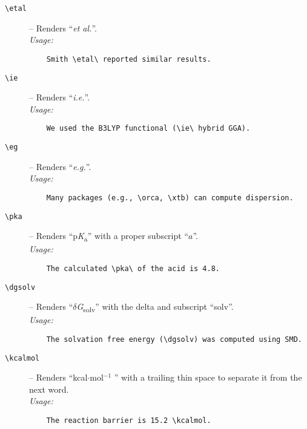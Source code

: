 \documentclass[a4paper,12pt]{article}
\begin{document}
\begin{description}
    \item[\texttt{\textbackslash etal}]  – Renders “\textit{et al.}”. \\
    \textit{Usage:} 
    \begin{verbatim}
    Smith \etal\ reported similar results.
    \end{verbatim}

    \item[\texttt{\textbackslash ie}]    – Renders “\textit{i.e.}”. \\
    \textit{Usage:} 
    \begin{verbatim}
    We used the B3LYP functional (\ie\ hybrid GGA).
    \end{verbatim}

    \item[\texttt{\textbackslash eg}]   – Renders “\textit{e.g.}”. \\
    \textit{Usage:} 
    \begin{verbatim}
    Many packages (e.g., \orca, \xtb) can compute dispersion.
    \end{verbatim}

    \item[\texttt{\textbackslash pka}]   – Renders “p\textit{K}\textsubscript{a}” with a proper subscript “$a$”. \\
    \textit{Usage:} 
    \begin{verbatim}
    The calculated \pka\ of the acid is 4.8.
    \end{verbatim}

    \item[\texttt{\textbackslash dgsolv}] – Renders “$\delta$\textit{G}\textsubscript{solv}” with the delta and subscript “solv”. \\
    \textit{Usage:} 
    \begin{verbatim}
    The solvation free energy (\dgsolv) was computed using SMD.
    \end{verbatim}

    \item[\texttt{\textbackslash kcalmol}] – Renders “kcal$\cdot$mol$^{-1}$ ” with a trailing thin space to separate it from the next word. \\
    \textit{Usage:} 
    \begin{verbatim}
    The reaction barrier is 15.2 \kcalmol.
    \end{verbatim}
\end{description}
\end{document}
